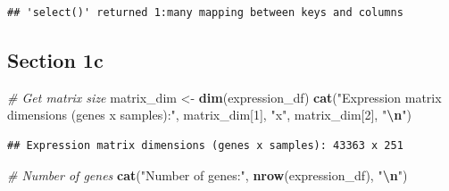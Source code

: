 \documentclass[
]{article}
\newenvironment{Shaded}{\begin{snugshade}}{\end{snugshade}}
\newcommand{\CommentTok}[1]{\textcolor[rgb]{0.56,0.35,0.01}{\textit{#1}}}
\newcommand{\DecValTok}[1]{\textcolor[rgb]{0.00,0.00,0.81}{#1}}
\newcommand{\FunctionTok}[1]{\textcolor[rgb]{0.13,0.29,0.53}{\textbf{#1}}}
\newcommand{\NormalTok}[1]{#1}
\newcommand{\OtherTok}[1]{\textcolor[rgb]{0.56,0.35,0.01}{#1}}
\newcommand{\SpecialCharTok}[1]{\textcolor[rgb]{0.81,0.36,0.00}{\textbf{#1}}}
\newcommand{\StringTok}[1]{\textcolor[rgb]{0.31,0.60,0.02}{#1}}
\begin{document}
\begin{verbatim}
## 'select()' returned 1:many mapping between keys and columns
\end{verbatim}

\begin{Shaded}
\end{Shaded}

\subsection{Section 1c}\label{section-1c}

\begin{Shaded}
\begin{Highlighting}[]
\CommentTok{\# Get matrix size}
\NormalTok{matrix\_dim }\OtherTok{\textless{}{-}} \FunctionTok{dim}\NormalTok{(expression\_df)}
\FunctionTok{cat}\NormalTok{(}\StringTok{"Expression matrix dimensions (genes x samples):"}\NormalTok{, matrix\_dim[}\DecValTok{1}\NormalTok{], }\StringTok{"x"}\NormalTok{, matrix\_dim[}\DecValTok{2}\NormalTok{], }\StringTok{"}\SpecialCharTok{\textbackslash{}n}\StringTok{"}\NormalTok{)}
\end{Highlighting}
\end{Shaded}

\begin{verbatim}
## Expression matrix dimensions (genes x samples): 43363 x 251
\end{verbatim}

\begin{Shaded}
\begin{Highlighting}[]
\CommentTok{\# Number of genes}
\FunctionTok{cat}\NormalTok{(}\StringTok{"Number of genes:"}\NormalTok{, }\FunctionTok{nrow}\NormalTok{(expression\_df), }\StringTok{"}\SpecialCharTok{\textbackslash{}n}\StringTok{"}\NormalTok{)}
\end{Highlighting}
\end{Shaded}
\end{document}
